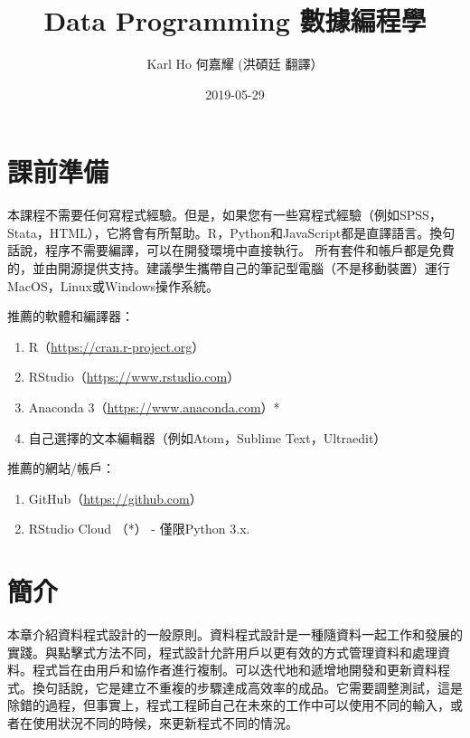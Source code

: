 \documentclass[]{book}
\title{Data Programming 數據編程學}
\author{Karl Ho 何嘉耀 (洪碩廷 翻譯）}
\date{2019-05-29}
\providecommand{\tightlist}{%
  \setlength{\itemsep}{0pt}\setlength{\parskip}{0pt}}
\begin{document}
\maketitle

{
\setcounter{tocdepth}{1}
\tableofcontents
}
\hypertarget{section}{%
\chapter{課前準備}\label{section}}

本課程不需要任何寫程式經驗。但是，如果您有一些寫程式經驗（例如SPSS，Stata，HTML），它將會有所幫助。R，Python和JavaScript都是直譯語言。換句話說，程序不需要編譯，可以在開發環境中直接執行。
所有套件和帳戶都是免費的，並由開源提供支持。建議學生攜帶自己的筆記型電腦（不是移動裝置）運行MacOS，Linux或Windows操作系統。

推薦的軟體和編譯器：

\begin{enumerate}
\def\labelenumi{\arabic{enumi}.}
\tightlist
\item
  R（\url{https://cran.r-project.org}）
\item
  RStudio（\url{https://www.rstudio.com}）
\item
  Anaconda 3（\url{https://www.anaconda.com}）*
\item
  自己選擇的文本編輯器（例如Atom，Sublime Text，Ultraedit）
\end{enumerate}

推薦的網站/帳戶：

\begin{enumerate}
\def\labelenumi{\arabic{enumi}.}
\tightlist
\item
  GitHub（\url{https://github.com}）
\item
  RStudio Cloud
  （*） - 僅限Python 3.x.
\end{enumerate}

\hypertarget{intro}{%
\chapter{簡介}\label{intro}}

本章介紹資料程式設計的一般原則。資料程式設計是一種隨資料一起工作和發展的實踐。與點擊式方法不同，程式設計允許用戶以更有效的方式管理資料和處理資料。程式旨在由用戶和協作者進行複制。可以迭代地和遞增地開發和更新資料程式。換句話說，它是建立不重複的步驟達成高效率的成品。它需要調整測試，這是除錯的過程，但事實上，程式工程師自己在未來的工作中可以使用不同的輸入，或者在使用狀況不同的時候，來更新程式不同的情況。
\end{document}
